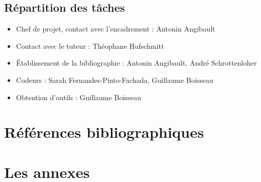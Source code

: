 \documentclass{article}           %
\begin{document}
\subsection{Répartition des tâches}%
\begin{itemize}
	\item Chef de projet, contact avec l'encadrement : Antonin Angibault
	\item Contact avec le tuteur : Théophane Hufschmitt
	\item Établissement de la bibliographie : Antonin Angibault, André Schrottenloher
	\item Codeurs : Sarah Fernandes-Pinto-Fachada, Guillaume Boisseau
	\item Obtention d'outils : Guillaume Boisseau
\end{itemize}


\section{Références bibliographiques}

\nocite{*}
\printbibliography



\appendix
\section{Les annexes}
\end{document}
